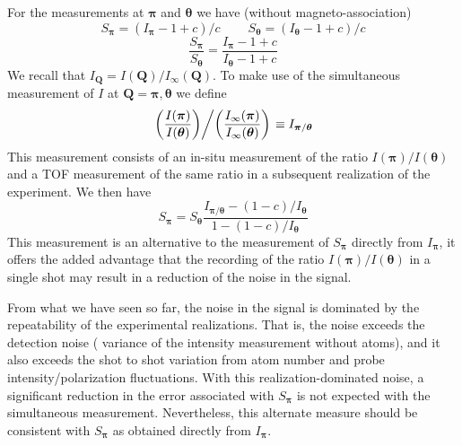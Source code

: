 \documentclass[11pt,letter]{article}
\newcommand{\bv}[1]{\ensuremath{\bm{#1}}}
\newcommand{\itof}{\ensuremath{I_{\infty} }}
\begin{document}
For the measurements at $\bv{\pi}$ and $\bv{\theta}$ we have (without
magneto-association)
\begin{equation}
   S_{\bv{\pi}} = (I_{\bv{\pi}} - 1 + c)/c  
  \ \ \ \ \ \ \ \ \ \ 
   S_{\bv{\theta}} = (I_{\bv{\theta}} - 1 + c)/c  
\end{equation}
\begin{equation}
  \frac{ S_{\bv{\pi}} }{ S_{\bv{\theta}}} = 
  \frac{ I_{\bv{\pi}} - 1 + c }{ I_{\bv{\theta}} - 1 + c } 
\end{equation}
We recall that $I_{\bv{Q}} = I(\bv{Q}) / \itof (\bv{Q})$.  To make use of the
simultaneous measurement of $I$ at $\bv{Q}= \bv{\pi}, \bv{\theta}$ we define 
\begin{equation}
  \left. 
  \left( \frac{ I(\bv{\pi})}{I(\bv{\theta})} \right)  \middle/  
  \left( \frac{ \itof(\bv{\pi})}{\itof(\bv{\theta})} \right)  
  \right.  \equiv I_{\bv{\pi}/\bv{\theta}}
\end{equation}
This measurement consists of an in-situ measurement of the ratio
$I(\bv{\pi})/I(\bv{\theta})$  and a TOF measurement of the same ratio
in a subsequent realization of the experiment.  We then have 
\begin{equation}
   S_{\bv{\pi}}  = S_{\bv{\theta}}
  \frac{ I_{\bv{\pi}/\bv{\theta}} - ( 1 - c )/I_{\bv{\theta}} }
        { 1 - (1 - c)/I_{\bv{\theta}} } 
\end{equation}
This measurement is an alternative to the measurement of $S_{\bv{\pi}}$
directly from $I_{\bv{\pi}}$,  it offers the added advantage that the recording
of the ratio $I(\bv{\pi})/I(\bv{\theta})$ in a single shot may result in a
reduction of the noise in the signal.   

From what we have seen so far, the noise in the signal is dominated by the
repeatability of the experimental realizations.  That is, the noise exceeds the
detection noise ( variance of the intensity measurement without atoms), and it
also exceeds the shot to shot variation from atom number and probe
intensity/polarization fluctuations.    With this realization-dominated noise, a
significant reduction in the error associated with $S_{\bv{\pi}}$ is not
expected with the simultaneous measurement.  Nevertheless, this alternate
measure should be consistent with $S_{\bv{\pi}}$ as obtained directly from
$I_{\bv{\pi}}$.  

 



\end{document}
